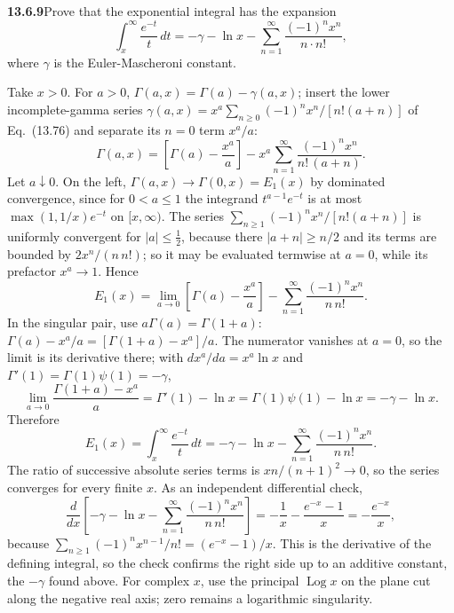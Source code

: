 \par\bigskip
\noindent\textbf{13.6.9}\quad Prove that the exponential integral has the
expansion
\[
\int_{x}^{\infty}\frac{e^{-t}}{t}\,dt
=-\gamma-\ln x-\sum_{n=1}^{\infty}\frac{(-1)^{n}x^{n}}{n\cdot n!},
\]
where $\gamma$ is the Euler-Mascheroni constant.
\par\smallskip
{}
\solution
Take $x>0$.  For $a>0$, $\Gamma(a,x)=\Gamma(a)-\gamma(a,x)$;
insert the lower incomplete-gamma series
$\gamma(a,x)=x^a\sum_{n\ge0}(-1)^nx^n/[n!(a+n)]$ of Eq.~(13.76)
and separate its $n=0$ term $x^a/a$:
\[
\Gamma(a,x)=\left[\Gamma(a)-\frac{x^a}{a}\right]
-x^a\sum_{n=1}^{\infty}\frac{(-1)^nx^n}{n!\,(a+n)}.
\]
Let $a\downarrow0$.  On the left, $\Gamma(a,x)\to\Gamma(0,x)=E_1(x)$
by dominated convergence, since for $0<a\le1$ the integrand
$t^{a-1}e^{-t}$ is at most $\max(1,1/x)e^{-t}$ on $[x,\infty)$.
The series $\sum_{n\ge1}(-1)^nx^n/[n!(a+n)]$ is uniformly
convergent for $|a|\le\frac12$, because there $|a+n|\ge n/2$ and
its terms are bounded by $2x^n/(n\,n!)$; so it may be evaluated
termwise at $a=0$, while its prefactor $x^a\to1$.  Hence
\[
E_1(x)=\lim_{a\to0}\left[\Gamma(a)-\frac{x^a}{a}\right]
-\sum_{n=1}^{\infty}\frac{(-1)^nx^n}{n\,n!}.
\]
In the singular pair, use $a\Gamma(a)=\Gamma(1+a)$:
$\Gamma(a)-x^a/a=[\Gamma(1+a)-x^a]/a$.  The numerator vanishes at
$a=0$, so the limit is its derivative there; with
$dx^a/da=x^a\ln x$ and $\Gamma'(1)=\Gamma(1)\psi(1)=-\gamma$,
\[
\lim_{a\to0}\frac{\Gamma(1+a)-x^a}{a}
=\Gamma'(1)-\ln x
=\Gamma(1)\psi(1)-\ln x=-\gamma-\ln x.
\]
Therefore
\[
\boxed{E_1(x)=\int_x^\infty\frac{e^{-t}}t\,dt
=-\gamma-\ln x-\sum_{n=1}^{\infty}\frac{(-1)^nx^n}{n\,n!}}.
\]
The ratio of successive absolute series terms is
$xn/(n+1)^2\to0$, so the series converges for every finite $x$.
As an independent differential check,
\[
\frac d{dx}\left[-\gamma-\ln x-
\sum_{n=1}^{\infty}\frac{(-1)^nx^n}{n\,n!}\right]
=-\frac1x-\frac{e^{-x}-1}{x}=-\frac{e^{-x}}x,
\]
because $\sum_{n\ge1}(-1)^nx^{n-1}/n!=(e^{-x}-1)/x$.  This is the
derivative of the defining integral, so the check confirms the
right side up to an additive constant, the $-\gamma$ found above.  For complex
$x$, use the principal $\operatorname{Log} x$ on the plane cut along the
negative real axis; zero remains a logarithmic singularity.


